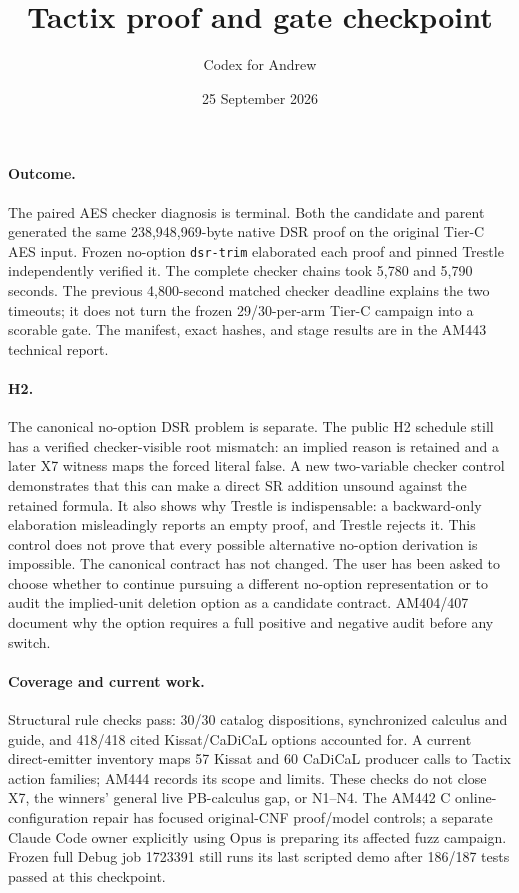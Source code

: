 \documentclass[11pt]{article}
\title{Tactix proof and gate checkpoint}
\author{Codex for Andrew}
\date{25 September 2026}
\begin{document}
\maketitle

\paragraph{Outcome.} The paired AES checker diagnosis is terminal. Both the
candidate and parent generated the same 238,948,969-byte native DSR proof on
the original Tier-C AES input. Frozen no-option \texttt{dsr-trim} elaborated
each proof and pinned Trestle independently verified it. The complete checker
chains took 5,780 and 5,790 seconds. The previous 4,800-second matched
checker deadline explains the two timeouts; it does not turn the frozen
29/30-per-arm Tier-C campaign into a scorable gate. The manifest, exact hashes,
and stage results are in the AM443 technical report.

\paragraph{H2.} The canonical no-option DSR problem is separate. The public
H2 schedule still has a verified checker-visible root mismatch: an implied
reason is retained and a later X7 witness maps the forced literal false.
A new two-variable checker control demonstrates that this can make a direct
SR addition unsound against the retained formula. It also shows why Trestle
is indispensable: a backward-only elaboration misleadingly reports an empty
proof, and Trestle rejects it. This control does not prove that every possible
alternative no-option derivation is impossible. The canonical contract has
not changed. The user has been asked to choose whether to continue pursuing a
different no-option representation or to audit the implied-unit deletion
option as a candidate contract. AM404/407 document why the option requires a
full positive and negative audit before any switch.

\paragraph{Coverage and current work.} Structural rule checks pass: 30/30
catalog dispositions, synchronized calculus and guide, and 418/418 cited
Kissat/CaDiCaL options accounted for. A current direct-emitter inventory maps
57 Kissat and 60 CaDiCaL producer calls to Tactix action families; AM444
records its scope and limits. These checks do not close X7, the winners'
general live PB-calculus gap, or N1--N4. The AM442 C online-configuration
repair has focused original-CNF proof/model controls; a separate Claude Code
owner explicitly using Opus is preparing its affected fuzz campaign. Frozen
full Debug job 1723391 still runs its last scripted demo after 186/187 tests
passed at this checkpoint.
\end{document}
